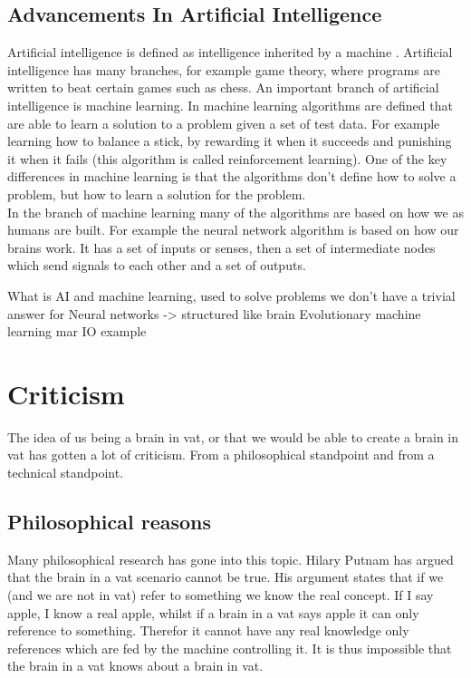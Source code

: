 \documentclass[a4paper]{article}
\begin{document}
\subsection{Advancements In Artificial Intelligence}
Artificial intelligence is defined as intelligence inherited by a machine \cite{AIbasic}. Artificial intelligence has many branches, for example game theory, where programs are written to beat certain games such as chess. An important branch of artificial intelligence is machine learning. In machine learning algorithms are defined that are able to learn a solution to a problem given a set of test data. For example learning how to balance a stick, by rewarding it when it succeeds and punishing it when it fails (this algorithm is called reinforcement learning). One of the key differences in machine learning is that the algorithms don't define how to solve a problem, but how to learn a solution for the problem.\\

In the branch of machine learning many of the algorithms are based on how we as humans are built. For example the neural network algorithm is based on how our brains work. It has a set of inputs or senses, then a set of intermediate nodes which send signals to each other and a set of outputs.


What is AI and machine learning, used to solve problems we don't have a trivial answer for
Neural networks -> structured like brain
Evolutionary machine learning
mar IO example



 
 
\section{Criticism}
The idea of us being a brain in vat, or that we would be able to create a brain in vat has gotten a lot of criticism. From a philosophical standpoint and from a technical standpoint.
\subsection{Philosophical reasons}
Many philosophical research has gone into this topic. Hilary Putnam has argued that the brain in a vat scenario cannot be true. His argument states that if we (and we are not in vat) refer to something we know the real concept. If I say apple, I know a real apple, whilst if a brain in a vat says apple it can only reference to something. Therefor it cannot have any real knowledge only references which are fed by the machine controlling it. It is thus impossible that the brain in a vat knows about a brain in vat.\\
\end{document}
